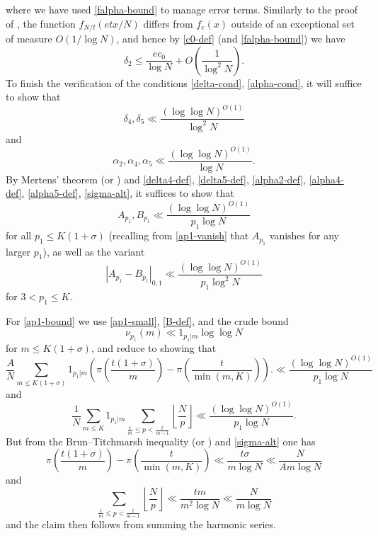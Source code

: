 \documentclass[12pt,a4paper,reqno]{amsart}
\numberwithin{equation}{section}
\theoremstyle{plain}
\theoremstyle{definition}
\begin{document}
where we have used \eqref{falpha-bound} to manage error terms.
Similarly to the proof of , the function $f_{N/t}(etx/N)$ differs from $f_e(x)$ outside of an exceptional set of measure $O(1/\log N)$, and hence by \eqref{c0-def} (and \eqref{falpha-bound}) we have
$$ \delta_2 \leq \frac{ec_0}{\log N} + O\left( \frac{1}{\log^2 N} \right).$$
To finish the verification of the conditions \eqref{delta-cond}, \eqref{alpha-cond}, it will suffice to show that
\begin{equation}\label{delta-remaining}
\delta_4, \delta_5 \ll \frac{(\log\log N)^{O(1)}}{\log^2 N}
\end{equation}
and
\begin{equation}\label{alpha-remaining}
\alpha_2, \alpha_4, \alpha_5 \ll \frac{(\log\log N)^{O(1)}}{\log N}.
\end{equation}
By Mertens' theorem (or ) and \eqref{delta4-def}, \eqref{delta5-def}, \eqref{alpha2-def}, \eqref{alpha4-def}, \eqref{alpha5-def}, \eqref{sigma-alt}, it suffices to show that
\begin{equation}\label{ap1-bound}
A_{p_1}, B_{p_1} \ll \frac{(\log\log N)^{O(1)}}{p_1 \log N} 
\end{equation}
for all $p_1 \leq K(1+\sigma)$ (recalling from \eqref{ap1-vanish} that $A_{p_1}$ vanishes for any larger $p_1$), as well as the variant
\begin{equation}\label{ap1-diff}
  |A_{p_1}-B_{p_1}|_{0,1} \ll \frac{(\log\log N)^{O(1)}}{p_1 \log^2 N}
\end{equation}
for $3 < p_1 \leq K$.

For \eqref{ap1-bound} we use \eqref{ap1-small}, \eqref{B-def}, and the crude bound 
\begin{equation}\label{crude}
  \nu_{p_1}(m) \ll 1_{p_1|m} \log\log N
\end{equation}
 for $m \leq K(1+\sigma)$, and reduce to showing that
$$ \frac{A}{N} \sum_{m \leq K(1+\sigma)} 1_{p_1|m} \left( \pi\left(\frac{t(1+\sigma)}{m}\right) - \pi\left(\frac{t}{\min(m,K)} \right) \right).
\ll \frac{(\log\log N)^{O(1)}}{p_1 \log N}$$
and
$$ \frac{1}{N} \sum_{m \leq K} 1_{p_1|m} \sum_{\frac{t}{m} \leq p < \frac{t}{m-1}} \left \lfloor \frac{N}{p} \right\rfloor \ll
\frac{(\log\log N)^{O(1)}}{p_1 \log N}.$$ 
But from the Brun--Titchmarsh inequality (or ) and \eqref{sigma-alt} one has
$$ \pi\left(\frac{t(1+\sigma)}{m}\right) - \pi\left(\frac{t}{\min(m,K)}\right) \ll \frac{t\sigma}{m \log N} \ll \frac{N}{Am \log N}$$
and
$$ \sum_{\frac{t}{m} \leq p < \frac{t}{m-1}} \left \lfloor \frac{N}{p} \right\rfloor \ll \frac{tm}{m^2 \log N} \ll \frac{N}{m \log N}$$
and the claim then follows from summing the harmonic series.
\end{document}
